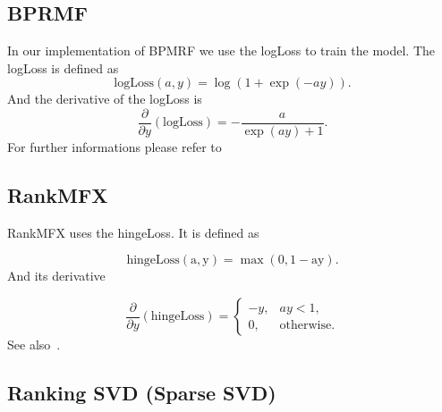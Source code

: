 \subsection{BPRMF}

In our implementation of BPMRF we use the logLoss to train the model. The logLoss is defined
as
\begin{equation}
\textrm{logLoss}(a,y)=\log(1+\exp(-ay)).
\end{equation}
And the derivative of the logLoss is
\begin{equation}
\frac{\partial}{\partial y}(\textrm{logLoss})=-\frac{a}{\exp(ay)+1}.
\end{equation}
For further informations please refer to~\cite{Rendle:2009:BBP:1795114.1795167}


\subsection{RankMFX}

RankMFX uses the hingeLoss. It is defined as

\begin{equation}
\mathrm{\textrm{hingeLoss}(a,y)=\max(0,1-ay)}.
\end{equation}
And its derivative

\begin{equation}
\frac{\partial}{\partial y}(\textrm{hingeLoss})=\begin{cases}
-y, & ay<1,\\
0, & \textrm{otherwise}.
\end{cases}
\end{equation}
See also~\cite{diaz2012happening}.


\subsection{Ranking SVD (Sparse SVD)}

